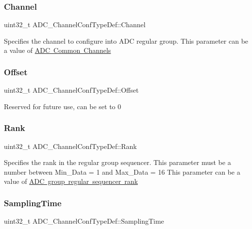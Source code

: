 \subsubsection{\texorpdfstring{Channel}{Channel}}
{\footnotesize\ttfamily uint32\+\_\+t A\+D\+C\+\_\+\+Channel\+Conf\+Type\+Def\+::\+Channel}

Specifies the channel to configure into A\+DC regular group. This parameter can be a value of \mbox{\hyperlink{group___a_d_c__channels}{A\+DC Common Channels}} \mbox{\label{struct_a_d_c___channel_conf_type_def_a481e92707be00870f495e8a63c6cc788}} 
\subsubsection{\texorpdfstring{Offset}{Offset}}
{\footnotesize\ttfamily uint32\+\_\+t A\+D\+C\+\_\+\+Channel\+Conf\+Type\+Def\+::\+Offset}

Reserved for future use, can be set to 0 \mbox{\label{struct_a_d_c___channel_conf_type_def_a106e52a928aefb7778802bac0b75cf2d}} 
\subsubsection{\texorpdfstring{Rank}{Rank}}
{\footnotesize\ttfamily uint32\+\_\+t A\+D\+C\+\_\+\+Channel\+Conf\+Type\+Def\+::\+Rank}

Specifies the rank in the regular group sequencer. This parameter must be a number between Min\+\_\+\+Data = 1 and Max\+\_\+\+Data = 16 This parameter can be a value of \mbox{\hyperlink{group___a_d_c__regular__rank}{A\+DC group regular sequencer rank}} \mbox{\label{struct_a_d_c___channel_conf_type_def_ae9486a657d515b87e2c2853db59afaaa}} 
\subsubsection{\texorpdfstring{SamplingTime}{SamplingTime}}
{\footnotesize\ttfamily uint32\+\_\+t A\+D\+C\+\_\+\+Channel\+Conf\+Type\+Def\+::\+Sampling\+Time}

